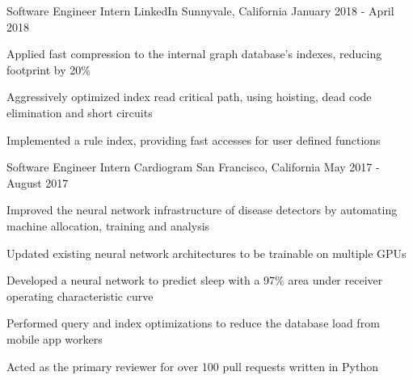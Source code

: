 


\begin{cventries}


\cventry
{Software Engineer Intern}
{LinkedIn}
{Sunnyvale, California}
{January 2018 - April 2018}
{ %
\begin{cvitems}
\item {Applied fast compression to the internal graph database's indexes, reducing footprint by 20\%}
\item {Aggressively optimized index read critical path, using hoisting, dead code elimination and short circuits}
\item {Implemented a rule index, providing fast accesses for user defined functions}
\end{cvitems}
}


\cventry
{Software Engineer Intern}
{Cardiogram}
{San Francisco, California}
{May 2017 - August 2017}
{ %
\begin{cvitems}
\item {Improved the neural network infrastructure of disease detectors by automating machine allocation, training and analysis}
\item {Updated existing neural network architectures to be trainable on multiple GPUs}
\item {Developed a neural network to predict sleep with a 97\% area under receiver operating characteristic curve}
\item {Performed query and index optimizations to reduce the database load from mobile app workers}
\item {Acted as the primary reviewer for over 100 pull requests written in Python}
\end{cvitems}
}



\end{cventries}
